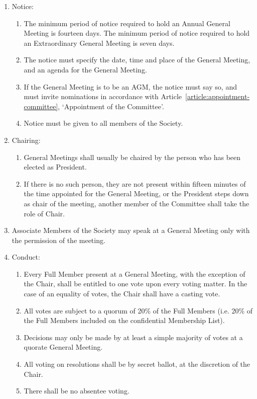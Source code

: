 \documentclass[12pt]{constitution}
\begin{document}
\begin{enumerate}
    \item Notice:
    \begin{enumerate}
        \item The minimum period of notice required to hold an Annual General Meeting is fourteen days. The minimum period of notice required to hold an Extraordinary General Meeting is seven days.
        \item The notice must specify the date, time and place of the General Meeting, and an agenda for the General Meeting.
        \item If the General Meeting is to be an AGM, the notice must say so, and must invite nominations in accordance with Article~\ref{article:appointment-committee}, `Appointment of the Committee'.
        \item Notice must be given to all members of the Society.
    \end{enumerate}

    \item Chairing:
    \begin{enumerate}
        \item General Meetings shall usually be chaired by the person who has been elected as President.
        \item If there is no such person, they are not present within fifteen minutes of the time appointed for the General Meeting, or the President steps down as chair of the meeting, another member of the Committee shall take the role of Chair.
    \end{enumerate}

    \item Associate Members of the Society may speak at a General Meeting only with the permission of the meeting.

    \item Conduct:
    \begin{enumerate}
        \item Every Full Member present at a General Meeting, with the exception of the Chair, shall be entitled to one vote upon every voting matter. In the case of an equality of votes, the Chair shall have a casting vote.
        \item All votes are subject to a quorum of 20\% of the Full Members (i.e. 20\% of the Full Members included on the confidential Membership List).
        \item Decisions may only be made by at least a simple majority of votes at a quorate General Meeting.
        \item All voting on resolutions shall be by secret ballot, at the discretion of the Chair.
        \item There shall be no absentee voting.
    \end{enumerate}


\end{enumerate}
\end{document}
